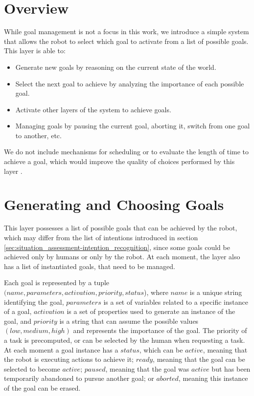 \section{Overview}
\label{sec:goal_management-overview}
While goal management is not a focus in this work, we introduce a simple system that allows the robot to select which goal to activate from a list of possible goals. This layer is able to:

\begin{itemize}
\item Generate new goals by reasoning on the current state of the world.
\item Select the next goal to achieve by analyzing the importance of each possible goal.
\item Activate other layers of the system to achieve goals.
\item Managing goals by pausing the current goal, aborting it, switch from one goal to another, etc.
\end{itemize}


We do not include mechanisms for scheduling or to evaluate the length of time to achieve a goal, which would improve the quality of choices performed by this layer .

\section{Generating and Choosing Goals}
\label{sec:goal_management-choosing}
This layer possesses a list of possible goals that can be achieved by the robot, which may differ from the list of intentions introduced in section \ref{sec:situation_assessment-intention_recognition}, since some goals could be achieved only by humans or only by the robot. At each moment, the layer also has a list of instantiated goals, that need to be managed.

Each goal is represented by a tuple $(name, parameters, activation, priority, status$), where $name$ is a unique string identifying the goal, $parameters$ is a set of variables related to a specific instance of a goal, $activation$ is a set of properties used to generate an instance of the goal, and $priority$ is a string that can assume the possible values $(low, medium, high)$ and represents the importance of the goal. The priority of a task is precomputed, or can be selected by the human when requesting a task. At each moment a goal instance has a $status$, which can be $active$, meaning that the robot is executing actions to achieve it; $ready$, meaning that the goal can be selected to become $active$; $paused$, meaning that the goal was $active$ but has been temporarily abandoned to pursue another goal; or $aborted$, meaning this instance of the goal can be erased.  

